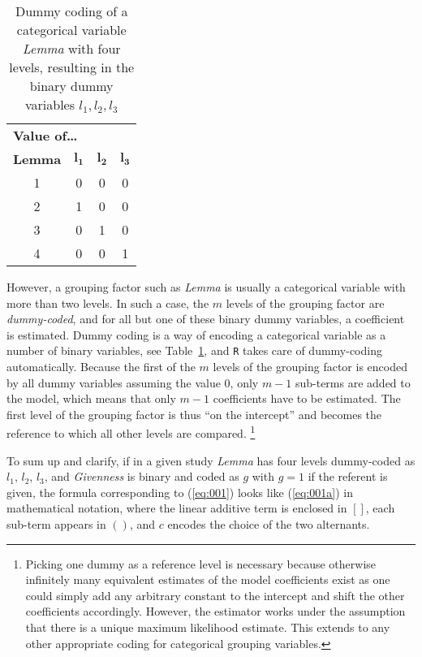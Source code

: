 \begin{table}
  \centering
  \begin{tabular}{cccc}
    \toprule
    \multicolumn{4}{l}{\textbf{Value of\ldots}} \\
    \textbf{Lemma} & $\mathbf{l_1}$ & $\mathbf{l_2}$ & $\mathbf{l_3}$ \\
    \midrule
    1 & 0 & 0 & 0 \\ 
    2 & 1 & 0 & 0 \\ 
    3 & 0 & 1 & 0 \\ 
    4 & 0 & 0 & 1 \\ 
    \bottomrule
  \end{tabular}
  \caption{Dummy coding of a categorical variable \textit{Lemma} with four levels, resulting in the binary dummy variables $l_1,l_2,l_3$}
  \label{tab:dummy}
\end{table}

However, a grouping factor such as \textit{Lemma} is usually a categorical variable with more than two levels.
In such a case, the $m$ levels of the grouping factor are \textit{dummy-coded}, and for all but one of these binary dummy variables, a coefficient is estimated.
Dummy coding is a way of encoding a categorical variable as a number of binary variables, see Table~\ref{tab:dummy}, and \texttt{R} takes care of dummy-coding automatically.
Because the first of the $m$ levels of the grouping factor is encoded by all dummy variables assuming the value 0, only $m-1$ sub-terms are added to the model, which means that only $m-1$ coefficients have to be estimated.
The first level of the grouping factor is thus ``on the intercept'' and becomes the reference to which all other levels are compared.%
\footnote{Picking one dummy as a reference level is necessary because otherwise infinitely many equivalent estimates of the model coefficients exist as one could simply add any arbitrary constant to the intercept and shift the other coefficients accordingly.
However, the estimator works under the assumption that there is a unique maximum likelihood estimate.
This extends to any other appropriate coding for categorical grouping variables.
}

To sum up and clarify, if in a given study \textit{Lemma} has four levels dummy-coded as $l_1$, $l_2$, $l_3$, and \textit{Givenness} is binary and coded as $g$ with $g=1$ if the referent is given, the formula corresponding to (\ref{eq:001}) looks like (\ref{eq:001a}) in mathematical notation, where the linear additive term is enclosed in $[ ]$, each sub-term appears in $( )$, and $c$ encodes the choice of the two alternants.

